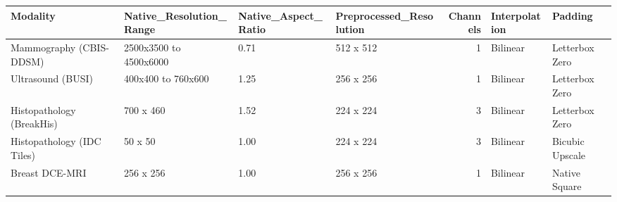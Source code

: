 \begin{tabular}{llllrll}
\toprule
Modality & Native_Resolution_Range & Native_Aspect_Ratio & Preprocessed_Resolution & Channels & Interpolation & Padding \\
\midrule
Mammography (CBIS-DDSM) & 2500x3500 to 4500x6000 & 0.71 & 512 x 512 & 1 & Bilinear & Letterbox Zero \\
Ultrasound (BUSI) & 400x400 to 760x600 & 1.25 & 256 x 256 & 1 & Bilinear & Letterbox Zero \\
Histopathology (BreakHis) & 700 x 460 & 1.52 & 224 x 224 & 3 & Bilinear & Letterbox Zero \\
Histopathology (IDC Tiles) & 50 x 50 & 1.00 & 224 x 224 & 3 & Bilinear & Bicubic Upscale \\
Breast DCE-MRI & 256 x 256 & 1.00 & 256 x 256 & 1 & Bilinear & Native Square \\
\bottomrule
\end{tabular}
